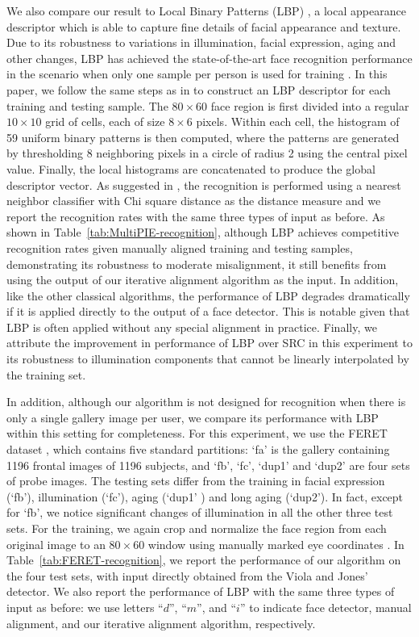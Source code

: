 \documentclass[10pt,journal,letterpaper,compsoc]{IEEEtran} %
\begin{document}
We also compare our result to Local Binary Patterns (LBP)
\cite{Ahonen2006-PAMI}, a local appearance descriptor which is
able to capture fine details of facial appearance and texture.
Due to its robustness to variations in illumination, facial
expression, aging and other changes, LBP has achieved the
state-of-the-art face recognition performance in the scenario
when only one sample per person is used for training
\cite{Tan06facerecognition}.
In this paper, we follow the same
steps as in \cite{Ahonen2006-PAMI} to construct an LBP
descriptor for each training and testing sample. The $80\times
60$ face region is first divided into a regular $10\times 10$
grid of cells, each of size $8\times 6$ pixels. Within each
cell, the histogram of 59 uniform binary patterns is then
computed, where the patterns are generated by thresholding 8
neighboring pixels in a circle of radius 2 using the central
pixel value. Finally, the local histograms are concatenated to
produce the global descriptor vector. As suggested in
\cite{Ahonen2006-PAMI}, the recognition is performed using a
nearest neighbor classifier with Chi square distance as the
distance measure and we report the recognition rates with the
same three types of input as before.  As shown in
Table~\ref{tab:MultiPIE-recognition}, although LBP achieves
competitive recognition rates given manually aligned training
and testing samples, demonstrating its robustness to moderate
misalignment, it still benefits from using the output of our
iterative alignment algorithm as the input.
In addition, like
the other classical algorithms, the performance of LBP degrades
dramatically if it is applied directly to the output of a face
detector. This is notable given that LBP is often applied
without any special alignment in practice. Finally, we
attribute the improvement in performance of LBP over SRC in
this experiment to its robustness to illumination components
that cannot be linearly interpolated by the training set.

In addition, although our algorithm is not designed for
recognition when there is only a single gallery image per user,
we compare its performance with LBP within this setting for
completeness. For this experiment, we use the FERET dataset
\cite{phillips1998feret}, which contains five standard
partitions: `fa' is the gallery containing 1196 frontal images
of 1196 subjects, and `fb', `fc', `dup1' and `dup2' are four
sets of probe images. The testing sets differ from the training
in facial expression (`fb'), illumination (`fc'), aging (`dup1'
) and long aging (`dup2'). In fact, except for `fb', we notice
significant changes of illumination in all the other three test
sets. For the training, we again crop and normalize the face
region from each original image to an $80\times 60$ window
using manually marked eye coordinates \cite{Deng2010-PR}. In
Table~\ref{tab:FERET-recognition}, we report the performance of
our algorithm on the four test sets, with input directly
obtained from the Viola and Jones' detector. We also report the
performance of LBP with the same three types of input as before:
we use letters
``$d$'', ``$m$'', and ``$i$'' to indicate face detector, manual
alignment, and our iterative alignment algorithm, respectively.
\end{document}
